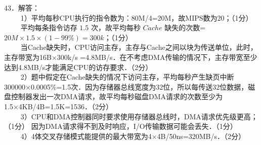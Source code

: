 43．解答：\\
$\qquad$ 1）平均每秒CPU执行的指令数为：80M/4=20M，故MIPS数为20；（1分） \\
$\qquad$ 平均每条指令访存 $1.5$ 次，故平均每秒 $Cache$ 缺失的次数=$20M \times 1.5 \times (1-99\%)=300k$；（1分） \\
$\qquad$ 当Cache缺失时，CPU访问主存，主存与Cache之间以块为传送单位，此时，主存带宽为16B×300k/s =4.8MB/s．在不考虑DMA传输的情况下，主存带宽至少达到4.8MB/s才能满足CPU的访存要求．（2分） \\
$\qquad$ 2）题中假定在Cache缺失的情况下访问主存，平均每秒产生缺页中断300000×0.0005\%=1.5次．因为存储器总线宽度为32位，所以每传送32位数据，磁盘控制器发出一次DMA请求，故平均每秒磁盘DMA请求的次数至少为1.5×4KB/4B=1.5K=1536．（2分） \\
$\qquad$ 3）CPU和DMA控制器同时要求使用存储器总线时，DMA请求优先级更高；（1分） 因为DMA请求得不到及时响应，I/O传输数据可能会丢失．（1分） \\
$\qquad$ 4）4体交叉存储模式能提供的最大带宽为4×4B/50ns=320MB/s．（2分）

